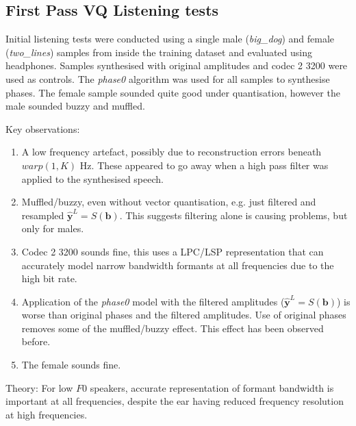 \documentclass{article}
\begin{document}
\subsection{First Pass VQ Listening tests}

Initial listening tests were conducted using a single male (\emph{big\_dog}) and female (\emph{two\_lines}) samples from inside the training dataset and evaluated using headphones.  Samples synthesised with original amplitudes and codec 2 3200 were used as controls.  The \emph{phase0} algorithm was used for all samples to synthesise phases. The female sample sounded quite good under quantisation, however the male sounded buzzy and muffled.

Key observations:
\begin{enumerate}
\item A low frequency artefact, possibly due to reconstruction errors beneath $warp(1,K)$ Hz.  These appeared to go away when a high pass filter was applied to the synthesised speech.
\item Muffled/buzzy, even without vector quantisation, e.g. just filtered and resampled $\hat{\mathbf{y}}^L = S(\mathbf{b})$.  This suggests filtering alone is causing problems, but only for males.
\item Codec 2 3200 sounds fine, this uses a LPC/LSP representation that can accurately model narrow bandwidth formants at all frequencies due to the high bit rate.
\item Application of the \emph{phase0} model with the filtered amplitudes ($\hat{\mathbf{y}}^L = S(\mathbf{b})$) is worse than original phases and the filtered amplitudes.  Use of original phases removes some of the muffled/buzzy effect.  This effect has been observed before.
\item The female sounds fine.
\end{enumerate}

Theory: For low $F0$ speakers, accurate representation of formant bandwidth is important at all frequencies, despite the ear having reduced frequency resolution at high frequencies.
\end{document}
